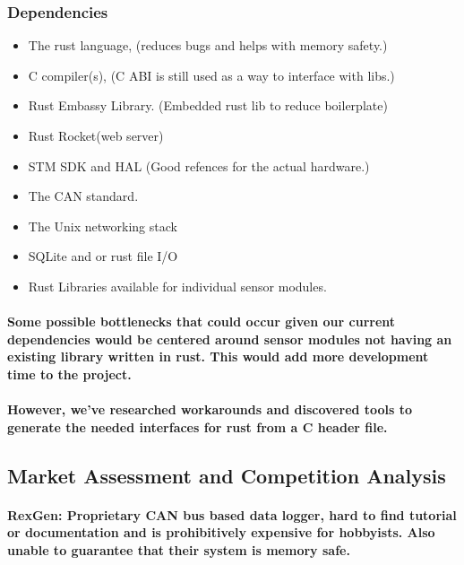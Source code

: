 \documentclass{article}
\begin{document}
\subsubsection{Dependencies}
\label{dependencies}

\begin{itemize}
\item
  The rust language, (reduces bugs and helps with memory safety.)
\item
  C compiler(s), (C ABI is still used as a way to interface with libs.)
\item
  Rust Embassy Library. (Embedded rust lib to reduce boilerplate)
\item
  Rust Rocket(web server)
\item
  STM SDK and HAL (Good refences for the actual hardware.)
\item
  The CAN standard.
\item
  The Unix networking stack
\item
  SQLite and or rust file I/O
\item
  Rust Libraries available for individual sensor modules.
\end{itemize}

\paragraph{
Some possible bottlenecks that could occur given our current
dependencies would be centered around sensor modules not having an
existing library written in rust. This would add more development time
to the project.
}

\paragraph{
However, we've researched workarounds and discovered tools to generate
the needed interfaces for rust from a C header file.
}

\subsection{Market Assessment and Competition Analysis}
\label{market-assessment-and-competition-analysis}

\paragraph{
\textbf{RexGen:} Proprietary CAN bus based data logger, hard to find
tutorial or documentation and is prohibitively expensive for hobbyists.
Also unable to guarantee that their system is memory safe.
}
\end{document}
